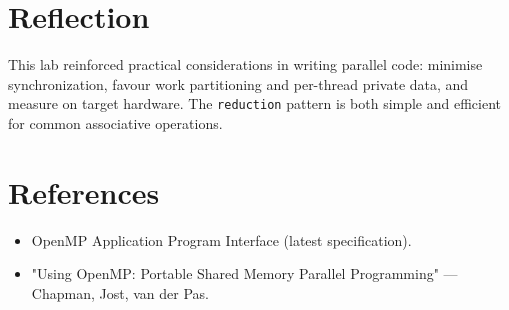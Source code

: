 \documentclass[11pt,a4paper]{article}
\begin{document}
\section{Reflection}
This lab reinforced practical considerations in writing parallel code: minimise synchronization, favour work partitioning and per-thread private data, and measure on target hardware. The \texttt{reduction} pattern is both simple and efficient for common associative operations.

\section*{References}
\begin{itemize}
  \item OpenMP Application Program Interface (latest specification).
  \item "Using OpenMP: Portable Shared Memory Parallel Programming" — Chapman, Jost, van der Pas.
\end{itemize}

\vfill
{}
\end{document}
